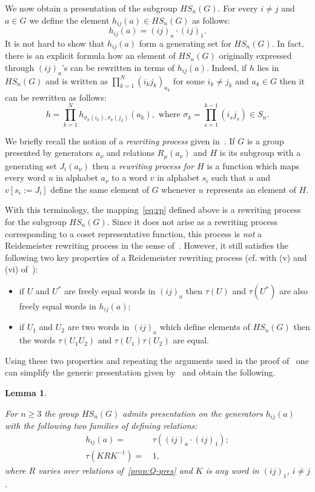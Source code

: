 \documentclass[oneside, 10pt]{amsart}
\theoremstyle{plain}
\numberwithin{equation}{section}
\newtheorem{lemma}{Lemma}
\numberwithin{lemma}{section}
\theoremstyle{remark}
\theoremstyle{definition}
\begin{document}
We now obtain a presentation of the subgroup $HS_n(G)$.
For every $i\neq j$ and $a\in G$ we define the element $h_{ij}(a) \in HS_n(G)$ as follows:
\begin{equation} \label{eq:h-def} 
h_{ij}(a) = (ij)_{a} \cdot (ij)_1. 
\end{equation}
It is not hard to show that $h_{ij}(a)$ form a generating set for $HS_n(G)$.
In fact, there is an explicit formula how an element of $HS_n(G)$ originally expressed through $(ij)_{a}$'s can be rewritten in terms of $h_{ij}(a)$.
Indeed, if $h$ lies in $HS_n(G)$ and is written as $\prod_{k=1}^N(i_k j_k)_{a_k}$ for some $i_k\neq j_k$ and $a_k\in G$ then it can be rewritten as follows:
\begin{equation} \label{eq:rp} \tag{$\tau$}
 h = \prod_{k=1}^N h_{\sigma_k(i_k), \sigma_k(j_k)}(a_k),\text{ where } \sigma_k=\prod_{s=1}^{k-1} (i_s j_s) \in S_n. \end{equation}

We briefly recall the notion of a {\it rewriting process} given in~\cite[\S~2.3]{MKS76}.
If $G$ is a group presented by generators $a_\nu$ and relations $R_{\mu}(a_{\nu})$ and $H$ is its subgroup with a generating set $J_i(a_\nu)$ then
 a {\it rewriting process for $H$} is a function which maps every word $u$ in alphabet $a_\nu$ to a word $v$ in alphabet $s_i$ such that
 $u$ and $v[s_i:=J_i]$ define the same element of $G$ whenever $u$ represents an element of $H$.

With this terminology, the mapping~\eqref{eq:rp} defined above is a rewriting process for the subgroup $HS_n(G)$.
Since it does not arise as a rewriting process corresponding to a coset representative function,
this process is {\it not} a Reidemeister rewriting process in the sense of~\cite[\S~2.3]{MKS76}.
However, it still satisfies the following two key properties of a Reidemeister rewriting process (cf. with (v) and (vi) of~\cite[\S~2.3]{MKS76}): 
\begin{itemize}
 \item if $U$ and $U^*$ are freely equal words in $(ij)_a$ then $\tau(U)$ and $\tau(U^*)$ are also freely equal words in $h_{ij}(a)$;
 \item if $U_1$ and $U_2$ are two words in $(ij)_a$ which define elements of $HS_n(G)$ then the words $\tau(U_1U_2)$ and $\tau(U_1) \tau(U_2)$ are equal.
\end{itemize}
Using these two properties and repeating the arguments used in the proof of~\cite[Theorem~2.8]{MKS76}
one can simplify the generic presentation given by~\cite[Theorem~2.6]{MKS76} and obtain the following.
\begin{lemma} \label{lm:h-gen}

 For $n\geq 3$ the group $HS_n(G)$ admits presentation on the generators $h_{ij}(a)$ with the following two families of defining relations:
 \begin{align}
  h_{ij}(a) = &\, \tau\left((ij)_a \cdot (ij)_1\right); \label{eq:tau1} \\
  \tau(KRK^{-1}) = &\, 1, \label{eq:tau2} 
 \end{align}  
 where $R$ varies over relations of~\cref{prop:Q-pres} and $K$ is any word in $(ij)_1$, $i\neq j$.
\end{lemma}
\end{document}
